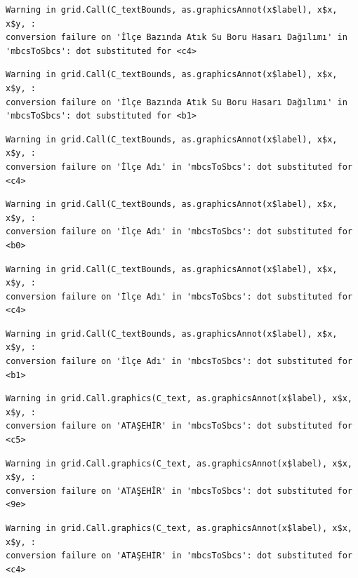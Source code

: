 \documentclass[
  11pt,
  a4paper,
  DIV=11,
  numbers=noendperiod]{scrartcl}
\begin{document}
\begin{verbatim}
Warning in grid.Call(C_textBounds, as.graphicsAnnot(x$label), x$x, x$y, :
conversion failure on 'İlçe Bazında Atık Su Boru Hasarı Dağılımı' in
'mbcsToSbcs': dot substituted for <c4>
\end{verbatim}

\begin{verbatim}
Warning in grid.Call(C_textBounds, as.graphicsAnnot(x$label), x$x, x$y, :
conversion failure on 'İlçe Bazında Atık Su Boru Hasarı Dağılımı' in
'mbcsToSbcs': dot substituted for <b1>
\end{verbatim}

\begin{verbatim}
Warning in grid.Call(C_textBounds, as.graphicsAnnot(x$label), x$x, x$y, :
conversion failure on 'İlçe Adı' in 'mbcsToSbcs': dot substituted for <c4>
\end{verbatim}

\begin{verbatim}
Warning in grid.Call(C_textBounds, as.graphicsAnnot(x$label), x$x, x$y, :
conversion failure on 'İlçe Adı' in 'mbcsToSbcs': dot substituted for <b0>
\end{verbatim}

\begin{verbatim}
Warning in grid.Call(C_textBounds, as.graphicsAnnot(x$label), x$x, x$y, :
conversion failure on 'İlçe Adı' in 'mbcsToSbcs': dot substituted for <c4>
\end{verbatim}

\begin{verbatim}
Warning in grid.Call(C_textBounds, as.graphicsAnnot(x$label), x$x, x$y, :
conversion failure on 'İlçe Adı' in 'mbcsToSbcs': dot substituted for <b1>
\end{verbatim}

\begin{verbatim}
Warning in grid.Call.graphics(C_text, as.graphicsAnnot(x$label), x$x, x$y, :
conversion failure on 'ATAŞEHİR' in 'mbcsToSbcs': dot substituted for <c5>
\end{verbatim}

\begin{verbatim}
Warning in grid.Call.graphics(C_text, as.graphicsAnnot(x$label), x$x, x$y, :
conversion failure on 'ATAŞEHİR' in 'mbcsToSbcs': dot substituted for <9e>
\end{verbatim}

\begin{verbatim}
Warning in grid.Call.graphics(C_text, as.graphicsAnnot(x$label), x$x, x$y, :
conversion failure on 'ATAŞEHİR' in 'mbcsToSbcs': dot substituted for <c4>
\end{verbatim}
\end{document}
